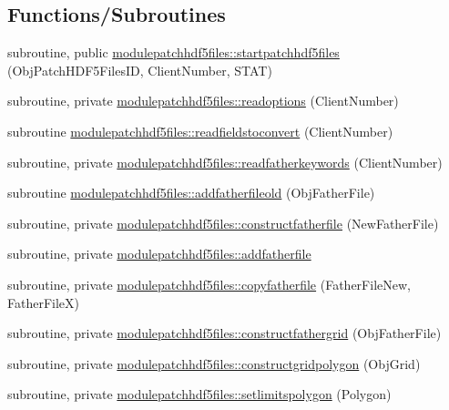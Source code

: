 \subsection*{Functions/\+Subroutines}
\begin{DoxyCompactItemize}
\item 
subroutine, public \mbox{\hyperlink{namespacemodulepatchhdf5files_a3b72c3b4723946c225c3539103a6662e}{modulepatchhdf5files\+::startpatchhdf5files}} (Obj\+Patch\+H\+D\+F5\+Files\+ID, Client\+Number, S\+T\+AT)
\item 
subroutine, private \mbox{\hyperlink{namespacemodulepatchhdf5files_a420e1d0c6143b57bc6eeb40569ba53d7}{modulepatchhdf5files\+::readoptions}} (Client\+Number)
\item 
subroutine \mbox{\hyperlink{namespacemodulepatchhdf5files_aae8026a08167779d4648093b3ace8cc4}{modulepatchhdf5files\+::readfieldstoconvert}} (Client\+Number)
\item 
subroutine, private \mbox{\hyperlink{namespacemodulepatchhdf5files_a82e18c8d58903480429c989b796d36e5}{modulepatchhdf5files\+::readfatherkeywords}} (Client\+Number)
\item 
subroutine \mbox{\hyperlink{namespacemodulepatchhdf5files_aa9460d2f9601999ea7cafe8b62a22757}{modulepatchhdf5files\+::addfatherfileold}} (Obj\+Father\+File)
\item 
subroutine, private \mbox{\hyperlink{namespacemodulepatchhdf5files_ae8a0b9a239c86e85ad55ca1d7e782f96}{modulepatchhdf5files\+::constructfatherfile}} (New\+Father\+File)
\item 
subroutine, private \mbox{\hyperlink{namespacemodulepatchhdf5files_af848d5f54e19e27edc34db3cb102d7d4}{modulepatchhdf5files\+::addfatherfile}}
\item 
subroutine, private \mbox{\hyperlink{namespacemodulepatchhdf5files_afdb5da0b3386fdd4fe2905c0bc1c4d09}{modulepatchhdf5files\+::copyfatherfile}} (Father\+File\+New, Father\+FileX)
\item 
subroutine, private \mbox{\hyperlink{namespacemodulepatchhdf5files_af7d7ef8ef3c8bc4d3657d8e7e892efe3}{modulepatchhdf5files\+::constructfathergrid}} (Obj\+Father\+File)
\item 
subroutine, private \mbox{\hyperlink{namespacemodulepatchhdf5files_aa75e619d235deca359ee164e27280e4c}{modulepatchhdf5files\+::constructgridpolygon}} (Obj\+Grid)
\item 
subroutine, private \mbox{\hyperlink{namespacemodulepatchhdf5files_aaa235a83ab0f98b8c034c89125019a93}{modulepatchhdf5files\+::setlimitspolygon}} (Polygon)
\item 

\end{DoxyCompactItemize}
